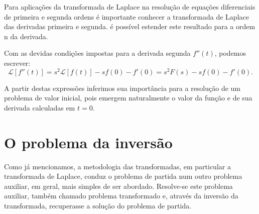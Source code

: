 

Para aplicações da transformada de Laplace na resolução de equações diferenciais de primeira e segunda ordens é importante conhecer a transformada de Laplace das derivadas primeira e segunda. é possível estender este resultado para a ordem n da derivada.

\teorema{Derivada primeira de $f(t)$}{teo:aula06.06}{%
Se a função $f(t)$ e sua derivada $f'(t)$ são admissíveis no intervalo $[0,\infty)$, então
\begin{equation}\label{eq:aula04.19}
\mathscr{L}[f'(t)] = s\mathscr{L}[f(t)] - f(0)= sF(s) - f(0).
\end{equation}
}


Com as devidas condições impostas para a derivada segunda $f''(t)$, podemos escrever:
\begin{equation}\label{eq:aula04.20}
\mathscr{L}[f''(t)] = s^{2}\mathscr{L}[f(t)] - sf(0) - f'(0) = s^{2}F(s) - sf(0) - f'(0).
\end{equation}


A partir destas expressões inferimos sua importância para a resolução de um problema de valor inicial, pois emergem naturalmente o valor da função e de sua derivada calculadas em $t = 0$.

\section{O problema da inversão}

Como já mencionamos, a metodologia das transformadas, em particular a transformada de Laplace, conduz o problema de partida num outro problema auxiliar, em geral, mais simples de ser abordado. Resolve-se este problema auxiliar, também chamado problema transformado e, através da inversão da transformada, recuperasse a solução do problema de partida.


